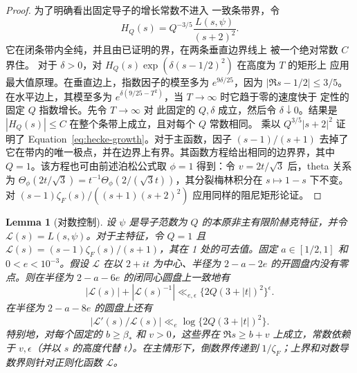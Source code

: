 \documentclass[11pt,a4paper]{article}
\numberwithin{equation}{section}
\numberwithin{figure}{section}
\newtheorem{lemma}[theorem]{Lemma}
\theoremstyle{definition}
\theoremstyle{remark}
\begin{document}
\begin{proof}
为了明确看出固定导子的增长常数不进入
一致条带界，令
\[
 H_Q(s)=Q^{-3/5}\frac{L(s,\psi)}{(s+2)^2}.
\]
它在闭条带内全纯，并且由已证明的界，在两条垂直边界线上
被一个绝对常数 $C$ 界住。
对于 $\delta>0$，对 $H_Q(s)\exp(\delta(s-1/2)^2)$ 在高度为 $T$ 的矩形上
应用最大值原理。在垂直边上，指数因子的模至多为 $e^{9\delta/25}$，因为
$|\Re s-1/2|\le3/5$。在水平边上，其模至多为
$e^{\delta(9/25-T^2)}$，当 $T\to\infty$ 时它趋于零的速度快于
定性的固定 $Q$ 指数增长。先令 $T\to\infty$ 对
此固定的 $Q,\delta$ 成立，然后令 $\delta\downarrow0$。结果是
$|H_Q(s)|\le C$ 在整个条带上成立，且对每个 $Q$ 常数相同。
乘以 $Q^{3/5}|s+2|^2$ 证明了
Equation~\eqref{eq:hecke-growth}。对于主函数，因子 $(s-1)/(s+1)$ 去掉了它在带内的唯一极点，并在边界上有界。其函数方程给出相同的边界界，其中 $Q=1$。该方程也可由前述泊松公式取 $\phi=1$ 得到：令 $v=2t/\sqrt3$ 后，theta 关系为
$\Theta_\phi(2t/\sqrt3)=t^{-1}\Theta_\phi(2/(\sqrt3t))$，其分裂梅林积分在 $s\mapsto1-s$ 下不变。对 $(s-1)\zeta_F(s)/((s+1)(s+2)^2)$ 应用同样的阻尼矩形论证。
\end{proof}

\begin{lemma}[对数控制]\label{lem:logarithmic-control}
设 $\psi$ 是导子范数为 $Q$ 的本原非主有限阶赫克特征，并令 $\mathcal L(s)=L(s,\psi)$。对于主特征，令 $Q=1$ 且
$\mathcal L(s)=(s-1)\zeta_F(s)/(s+1)$，其在 1 处的可去值。固定 $a\in[1/2,1]$ 和 $0<e<10^{-3}$。假设 $\mathcal L$ 在以 $2+it$ 为中心、半径为 $2-a-2e$ 的开圆盘内没有零点。则在半径为 $2-a-6e$ 的闭同心圆盘上一致地有
\begin{equation}\label{eq:disk-control}
 |\mathcal L(s)|+|\mathcal L(s)^{-1}|
 \ll_{e,\epsilon}\{2Q(3+|t|)^2\}^{\epsilon}.
\end{equation}
在半径为 $2-a-8e$ 的圆盘上还有
\[
 |\mathcal L'(s)/\mathcal L(s)|\ll_e\log\{2Q(3+|t|)^2\}.
\]
特别地，对每个固定的 $b\ge\beta_*$ 和 $v>0$，这些界在 $\Re s\ge b+v$ 上成立，常数依赖于 $v,\epsilon$（并以 $s$ 的高度代替 $t$）。在主情形下，倒数界传递到 $1/\zeta_F$；上界和对数导数界则针对正则化函数 $\mathcal L$。
\end{lemma}
\end{document}

